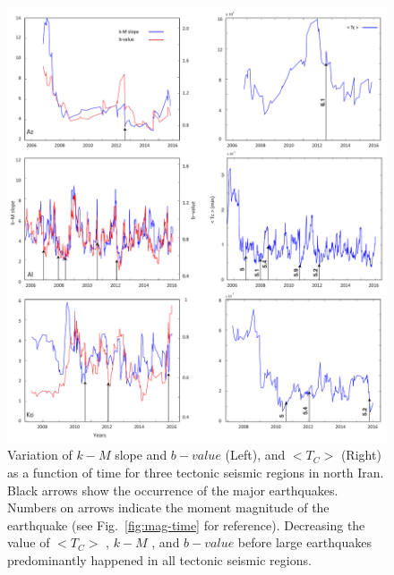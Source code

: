   
 \begin{figure} [ht]
\centering
\includegraphics[scale=0.4]{figures/pdf/Figure09.pdf} 
\caption{ Variation of $k-M$ slope  and $b-value$ (Left), and $ < T_C >$ (Right) as a function of time for three tectonic seismic regions in north Iran. Black arrows show the occurrence of the major earthquakes. Numbers on arrows indicate the moment magnitude of the earthquake (see Fig.~\ref{fig:mag-time} for reference). Decreasing the value of  $<T_C>$  ,  $k-M$ , and  $b-value$  before large earthquakes predominantly happened in all tectonic seismic regions.}
\label{fig:tc}
\end{figure}
 

